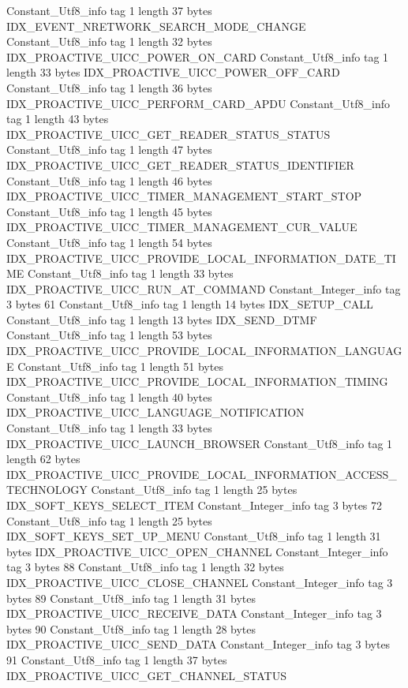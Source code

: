 {{		Constant_Utf8_info {
			tag	1
			length	37
			bytes	IDX_EVENT_NRETWORK_SEARCH_MODE_CHANGE
		}
		Constant_Utf8_info {
			tag	1
			length	32
			bytes	IDX_PROACTIVE_UICC_POWER_ON_CARD
		}
		Constant_Utf8_info {
			tag	1
			length	33
			bytes	IDX_PROACTIVE_UICC_POWER_OFF_CARD
		}
		Constant_Utf8_info {
			tag	1
			length	36
			bytes	IDX_PROACTIVE_UICC_PERFORM_CARD_APDU
		}
		Constant_Utf8_info {
			tag	1
			length	43
			bytes	IDX_PROACTIVE_UICC_GET_READER_STATUS_STATUS
		}
		Constant_Utf8_info {
			tag	1
			length	47
			bytes	IDX_PROACTIVE_UICC_GET_READER_STATUS_IDENTIFIER
		}
		Constant_Utf8_info {
			tag	1
			length	46
			bytes	IDX_PROACTIVE_UICC_TIMER_MANAGEMENT_START_STOP
		}
		Constant_Utf8_info {
			tag	1
			length	45
			bytes	IDX_PROACTIVE_UICC_TIMER_MANAGEMENT_CUR_VALUE
		}
		Constant_Utf8_info {
			tag	1
			length	54
			bytes	IDX_PROACTIVE_UICC_PROVIDE_LOCAL_INFORMATION_DATE_TIME
		}
		Constant_Utf8_info {
			tag	1
			length	33
			bytes	IDX_PROACTIVE_UICC_RUN_AT_COMMAND
		}
		Constant_Integer_info {
			tag	3
			bytes	61
		}
		Constant_Utf8_info {
			tag	1
			length	14
			bytes	IDX_SETUP_CALL
		}
		Constant_Utf8_info {
			tag	1
			length	13
			bytes	IDX_SEND_DTMF
		}
		Constant_Utf8_info {
			tag	1
			length	53
			bytes	IDX_PROACTIVE_UICC_PROVIDE_LOCAL_INFORMATION_LANGUAGE
		}
		Constant_Utf8_info {
			tag	1
			length	51
			bytes	IDX_PROACTIVE_UICC_PROVIDE_LOCAL_INFORMATION_TIMING
		}
		Constant_Utf8_info {
			tag	1
			length	40
			bytes	IDX_PROACTIVE_UICC_LANGUAGE_NOTIFICATION
		}
		Constant_Utf8_info {
			tag	1
			length	33
			bytes	IDX_PROACTIVE_UICC_LAUNCH_BROWSER
		}
		Constant_Utf8_info {
			tag	1
			length	62
			bytes	IDX_PROACTIVE_UICC_PROVIDE_LOCAL_INFORMATION_ACCESS_TECHNOLOGY
		}
		Constant_Utf8_info {
			tag	1
			length	25
			bytes	IDX_SOFT_KEYS_SELECT_ITEM
		}
		Constant_Integer_info {
			tag	3
			bytes	72
		}
		Constant_Utf8_info {
			tag	1
			length	25
			bytes	IDX_SOFT_KEYS_SET_UP_MENU
		}
		Constant_Utf8_info {
			tag	1
			length	31
			bytes	IDX_PROACTIVE_UICC_OPEN_CHANNEL
		}
		Constant_Integer_info {
			tag	3
			bytes	88
		}
		Constant_Utf8_info {
			tag	1
			length	32
			bytes	IDX_PROACTIVE_UICC_CLOSE_CHANNEL
		}
		Constant_Integer_info {
			tag	3
			bytes	89
		}
		Constant_Utf8_info {
			tag	1
			length	31
			bytes	IDX_PROACTIVE_UICC_RECEIVE_DATA
		}
		Constant_Integer_info {
			tag	3
			bytes	90
		}
		Constant_Utf8_info {
			tag	1
			length	28
			bytes	IDX_PROACTIVE_UICC_SEND_DATA
		}
		Constant_Integer_info {
			tag	3
			bytes	91
		}
		Constant_Utf8_info {
			tag	1
			length	37
			bytes	IDX_PROACTIVE_UICC_GET_CHANNEL_STATUS
		}
}}
